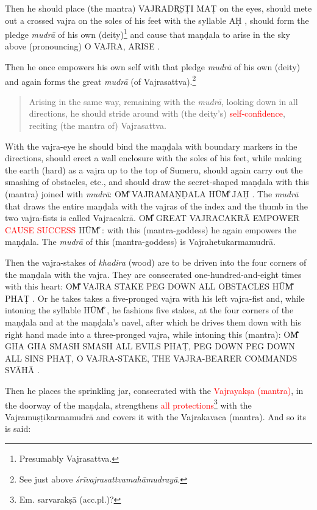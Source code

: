 \documentclass[11pt]{book}
\makeatletter
\def\fakesc#1{%
  \begingroup%
  \xdef\fake@name{\csname\curr@fontshape/\f@size\endcsname}%
  \fontsize{1.3\fontdimen8\fake@name}{\baselineskip}\selectfont%
  \uppercase{#1}%
  \endgroup%
}
\newcommand{\mantra}[1]{\fakesc{#1}}
\newcommand{\red}[1]{\textcolor{red}{#1}}
\newcommand{\skt}[1]{\emph{#1}}
\makeatother
\begin{document}
Then he should place (the mantra) \mantra{vajradr̥ṣṭi maṭ} on the eyes, should mete out a crossed vajra on the soles of his feet with the syllable \mantra{aḥ}, should form the pledge \skt{mudrā} of his own (deity)\footnote{Presumably Vajrasattva.} and cause that maṇḍala to arise in the sky above (pronouncing) \mantra{o vajra, arise}.\par

Then he once empowers his own self with that pledge \skt{mudrā} of his own (deity) and again forms the great \skt{mudrā} (of Vajrasattva).\footnote{See just above \skt{śrīvajrasattvamahāmudrayā}.}

\begin{verse}
Arising in the same way, remaining with the \skt{mudrā}, looking down in all directions, he should stride around with (the deity's) \red{self-confidence}, reciting (the mantra of) Vajrasattva.
\end{verse}

\noindent With the vajra-eye he should bind the maṇḍala with boundary markers in the directions, should erect a wall enclosure with the soles of his feet, while making the earth (hard) as a vajra up to the top of Sumeru, should again carry out the smashing of obstacles, etc., and should draw the secret-shaped maṇḍala with this (mantra) joined with \skt{mudrā}: \mantra{om̐ vajramaṇḍala hūm̐ jaḥ}. The \skt{mudrā} that draws the entire maṇḍala with the vajras of the index and the thumb in the two vajra-fists is called Vajracakrā. \mantra{om̐ great vajracakrā empower \red{cause success}%
 hūm̐}: with this (mantra-goddess) he again empowers the maṇḍala. The \skt{mudrā} of this (mantra-goddess) is Vajrahetukarmamudrā.

Then the vajra-stakes of \skt{khadira} (wood) are to be driven into the four corners of the maṇḍala with the vajra. They are consecrated one-hundred-and-eight times with this heart: \mantra{om̐ vajra stake peg down all obstacles hūm̐ phaṭ}. Or he takes takes a five-pronged vajra with his left vajra-fist and, while intoning the syllable \mantra{hūm̐}, he fashions five stakes, at the four corners of the maṇḍala and at the maṇḍala's navel, after which he drives them down with his right hand made into a three-pronged vajra, while intoning this (mantra): \mantra{om̐ gha gha smash smash all evils phaṭ, peg down peg down all sins phaṭ, o vajra-stake, the Vajra-bearer commands svāhā}.

Then he places the sprinkling jar, consecrated with the \red{Vajrayakṣa (mantra)}, in the doorway of the maṇḍala, strengthens \red{all protections}\footnote{Em. sarvarakṣā (acc.pl.)?} with the Vajramuṣṭikarmamudrā and covers it with the Vajrakavaca (mantra). And so its is said:
\end{document}
